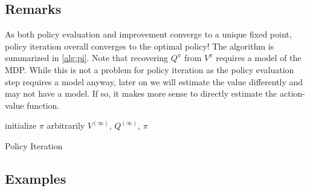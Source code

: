 		\subsection{Remarks}
			As both policy evaluation and improvement converge to a unique fixed point, policy iteration overall converges to the optimal policy! The algorithm is summarized in \autoref{alg:pi}. Note that recovering \(Q^\pi\) from \(V^\pi\) requires a model of the \ac{MDP}. While this is not a problem for policy iteration as the policy evaluation step requires a model anyway, later on we will estimate the value differently and may not have a model. If so, it makes more sense to directly estimate the action-value function.

			\begin{algorithm}  \DontPrintSemicolon
				initialize \( \pi \) arbitrarily \;
				\Return \( V^{(\infty)} \), \( Q^{(\infty)} \), \( \pi \)
				\caption{Policy Iteration}
				\label{alg:pi}
			\end{algorithm}

		\subsection{Examples} %

